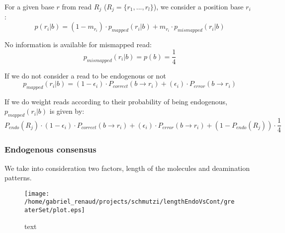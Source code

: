 \documentclass[a4paper,12pt]{article}
\begin{document}
\noindent For a given base $r$ from read $R_j$  ($R_j = \{ r_1, ..., r_l \}$), we consider a position base $r_{i}$ :
\begin{equation}
  p(r_i|b)   =  (1-m_{r_i}) \cdot p_{mapped}(r_i|b) + m_{r_i} \cdot p_{mismapped}(r_i|b) 
\end{equation} 


\noindent No information is available for mismapped read:
\begin{equation}
  p_{mismapped}(r_i|b)   =  p(b) =     \frac{ 1} {4} 
\end{equation} 



\noindent If we do not consider a read to be endogenous or not
\begin{equation}
  p_{mapped}(r_i|b)   =  (1-\epsilon_i ) \cdot  P_{correct}( b \to r_i) +  (\epsilon_i) \cdot P_{error}(  b \to r_i )   
\end{equation} 

\noindent If we do weight reads according to their probability of being endogenous, $p_{mapped}(r_i|b)$ is given by:
\begin{equation}
P_{endo}(R_j) \cdot (1-\epsilon_i ) \cdot  P_{correct}( b \to r_i) +  (\epsilon_i) \cdot P_{error}(  b \to r_i )   + (1-P_{endo}(R_j)) \cdot \frac {1} {4}
\end{equation} 



\subsubsection{Endogenous consensus}

We take into consideration two factors, length of the molecules and deamination patterns.


\begin{figure}[H]
\centering
\texttt{[image: /home/gabriel\_renaud/projects/schmutzi/lengthEndoVsCont/greaterSet/plot.eps]}
\caption{text}
\end{figure}
\end{document}
